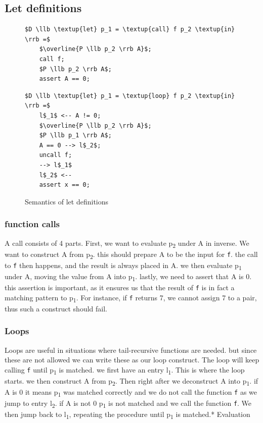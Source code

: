 \documentclass[a4paper]{article}
\begin{document}
\subsection{Let definitions}
\label{secdefs}
\begin{figure}[!htb]
\begin{minipage}{0.4\textwidth}
\begin{lstlisting}
$D \llb \textup{let} p_1 = \textup{call} f p_2 \textup{in} \rrb =$
    $\overline{P \llb p_2 \rrb A}$;
    call f;
    $P \llb p_2 \rrb A$;
    assert A == 0;
\end{lstlisting}
\end{minipage}
\qquad
\begin{minipage}{0.4\textwidth}
\begin{lstlisting}
$D \llb \textup{let} p_1 = \textup{loop} f p_2 \textup{in} \rrb =$
    l$_1$ <-- A != 0;
    $\overline{P \llb p_2 \rrb A}$;
    $P \llb p_1 \rrb A$;
    A == 0 --> l$_2$;
    uncall f;
    --> l$_1$
    l$_2$ <--
    assert x == 0;
\end{lstlisting}
\end{minipage}

\caption{Semantics of let definitions}
\label{defs}
\end{figure}
\subsubsection{function calls}
\label{sec:orgf21bddc}
A call consists of 4 parts. First, we want to evaluate p\textsubscript{2} under A in inverse. We want to construct A from p\textsubscript{2}. this should prepare A to be the input for \texttt{f}. the call to \texttt{f} then happens, and the result is always placed in A. we then evaluate p\textsubscript{1} under A, moving the value from A into p\textsubscript{1}. lastly, we need to assert that A is 0. this assertion is important, as it ensures us that the result of \texttt{f} is in fact a matching pattern to p\textsubscript{1}. For instance, if \texttt{f} returns 7, we cannot assign 7 to a pair, thus such a construct should fail.
\subsubsection{Loops}
\label{sec:org332d5f9}
Loops are useful in situations where tail-recursive functions are needed. but since these are not allowed we can write these as our loop construct. The loop will keep calling \texttt{f} until p\textsubscript{1} is matched. we first have an entry l\textsubscript{1}. This is where the loop starts. we then construct A from p\textsubscript{2}. Then right after we deconstruct A into p\textsubscript{1}. if A is 0 it means p\textsubscript{1} was matched correctly and we do not call the function \texttt{f} as we jump to entry l\textsubscript{2}. if A is not 0 p\textsubscript{1} is not matched and we call the function \texttt{f}. We then jump back to l\textsubscript{1}, repeating the procedure until p\textsubscript{1} is matched.* Evaluation
\end{document}
